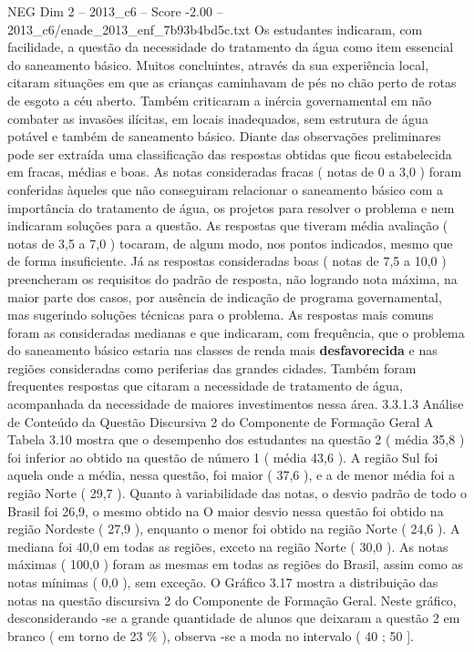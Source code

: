 \begin{textsample}{NEG Dim 2 – 2013\_c6 – Score -2.00 – 2013\_c6/enade\_2013\_enf\_7b93b4bd5c.txt}
Os estudantes indicaram, com facilidade, a questão da necessidade do tratamento da água como item essencial do saneamento básico.
Muitos concluintes, através da sua experiência local, citaram situações em que as crianças caminhavam de pés no chão perto de rotas de esgoto a céu aberto.
Também criticaram a inércia governamental em não combater as invasões ilícitas, em locais inadequados, sem estrutura de água potável e também de saneamento básico.
Diante das observações preliminares pode ser extraída uma classificação das respostas obtidas que ficou estabelecida em fracas, médias e boas.
As notas consideradas fracas ( notas de 0 a 3,0 ) foram conferidas àqueles que não conseguiram relacionar o saneamento básico com a importância do tratamento de água, os projetos para resolver o problema e nem indicaram soluções para a questão.
As respostas que tiveram média avaliação ( notas de 3,5 a 7,0 ) tocaram, de algum modo, nos pontos indicados, mesmo que de forma insuficiente.
Já as respostas consideradas boas ( notas de 7,5 a 10,0 ) preencheram os requisitos do padrão de resposta, não logrando nota máxima, na maior parte dos casos, por ausência de indicação de programa governamental, mas sugerindo soluções técnicas para o problema.
As respostas mais comuns foram as consideradas medianas e que indicaram, com frequência, que o problema do saneamento básico estaria nas classes de renda mais \textbf{desfavorecida} e nas regiões consideradas como periferias das grandes cidades.
Também foram frequentes respostas que citaram a necessidade de tratamento de água, acompanhada da necessidade de maiores investimentos nessa área. 3.3.1.3 Análise de Conteúdo da Questão Discursiva 2 do Componente de Formação Geral A Tabela 3.10 mostra que o desempenho dos estudantes na questão 2 ( média 35,8 ) foi inferior ao obtido na questão de número 1 ( média 43,6 ).
A região Sul foi aquela onde a média, nessa questão, foi maior ( 37,6 ), e a de menor média foi a região Norte ( 29,7 ).
Quanto à variabilidade das notas, o desvio padrão de todo o Brasil foi 26,9, o mesmo obtido na O maior desvio nessa questão foi obtido na região Nordeste ( 27,9 ), enquanto o menor foi obtido na região Norte ( 24,6 ).
A mediana foi 40,0 em todas as regiões, exceto na região Norte ( 30,0 ).
As notas máximas ( 100,0 ) foram as mesmas em todas as regiões do Brasil, assim como as notas mínimas ( 0,0 ), sem exceção.
O Gráfico 3.17 mostra a distribuição das notas na questão discursiva 2 do Componente de Formação Geral.
Neste gráfico, desconsiderando -se a grande quantidade de alunos que deixaram a questão 2 em branco ( em torno de 23 \% ), observa -se a moda no intervalo ( 40 ; 50 ].

\end{textsample}
